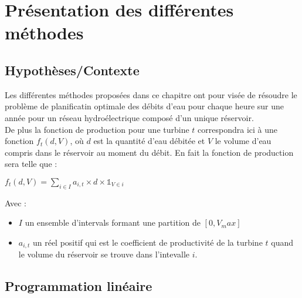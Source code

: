 \documentclass[a4paper]{report}
\begin{document}
\tableofcontents
\chapter{Présentation des différentes méthodes}
\section{Hypothèses/Contexte}
Les différentes méthodes proposées dans ce chapitre ont pour visée de résoudre le problème de planificatin optimale des débits d'eau pour chaque heure sur une année pour un réseau hydroélectrique composé d'un unique réservoir.\\
De plus la fonction de production pour une turbine $t$ correspondra ici à une fonction $f_t(d,V)$, où $d$ est la quantité d'eau débitée et $V$ le volume d'eau compris dans le réservoir au moment du débit. En fait la fonction de production sera telle que :\\
\begin{center}
  $f_t(d,V)=\sum_{i\in I} a_{i,t}\times d \times \mathbb{1}_{V \in i}$
\end{center}
Avec :\\
\begin{itemize}
  \item $I$ un ensemble d'intervals formant une partition de $[0, V_max]$
  \item $a_{i,t}$ un réel positif qui est le coefficient de productivité de la turbine $t$ quand le volume du réservoir se trouve dans l'intevalle $i$. 
\end{itemize}
\section{Programmation linéaire}
\end{document}
